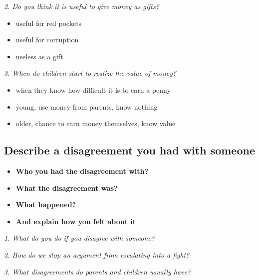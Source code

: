 \documentclass[conference]{IEEEtran}
\begin{document}
\textit{2. Do you think it is useful to give money as gifts?}
\begin{itemize}
    \item useful for red pockets
    \item useful for corruption
    \item useless as a gift
\end{itemize}

\textit{3. When do children start to realize the value of money?}
\begin{itemize}
    \item when they know how difficult it is to earn a penny
    \item young, use money from parents, know nothing
    \item older, chance to earn money themselves, know value
\end{itemize}

\subsection{Describe a disagreement you had with someone}
\begin{itemize}
    \item \textbf{Who you had the disagreement with?}
    
    \item \textbf{What the disagreement was?}
    \item \textbf{What happened?}
    \item \textbf{And explain how you felt about it}
\end{itemize}

\textit{1. What do you do if you disagree with someone?}

\textit{2. How do we stop an argument from escalating into a fight?}

\textit{3. What disagreements do parents and children usually have?}
\end{document}
